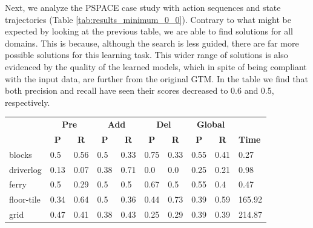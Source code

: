 Next, we analyze the PSPACE case study with \NO action sequences and state trajectories (Table \ref{tab:results_minimum_0_0}). Contrary to what might be expected by looking at the previous table, we are able to find solutions for all domains. This is because, although the search is less guided, there are far more possible solutions for this learning task. This wider range of solutions is also evidenced by the quality of the learned models, which in spite of being compliant with the input data, are further from the original GTM. In the table we find that both precision and recall have seen their scores decreased to 0.6 and 0.5, respectively. 

\begin{table}[hbt!]
	\begin{center}		
		\begin{tabular}{l|l|l|l|l|l|l||l|l|l|}
			& \multicolumn{2}{|c|}{\bf Pre} & \multicolumn{2}{|c|}{\bf Add} & \multicolumn{2}{|c||}{\bf Del} & \multicolumn{2}{|c|}{\bf Global} & \\ \cline{2-9}			
			& \multicolumn{1}{|c|}{\bf P} & \multicolumn{1}{|c|}{\bf R} & \multicolumn{1}{|c|}{\bf P} & \multicolumn{1}{|c|}{\bf R} & \multicolumn{1}{|c|}{\bf P} & \multicolumn{1}{|c||}{\bf R} &  \multicolumn{1}{|c|}{\bf P} & \multicolumn{1}{|c|}{\bf R} & {\bf Time} \\
			\hline
			blocks & 0.5 & 0.56 & 0.5 & 0.33 & 0.75 & 0.33 & 0.55 & 0.41& 0.27 \\ %
			driverlog & 0.13 & 0.07 & 0.38 & 0.71 & 0.0 & 0.0 & 0.25 & 0.21& 0.98 \\ %
			ferry & 0.5 & 0.29 & 0.5 & 0.5 & 0.67 & 0.5 & 0.55 & 0.4& 0.47 \\ %
			floor-tile & 0.34 & 0.64 & 0.5 & 0.36 & 0.44 & 0.73 & 0.39 & 0.59& 165.92 \\ %
			grid & 0.47 & 0.41 & 0.38 & 0.43 & 0.25 & 0.29 & 0.39 & 0.39& 214.87 \\ %

\end{tabular}
\end{center}
\end{table}
